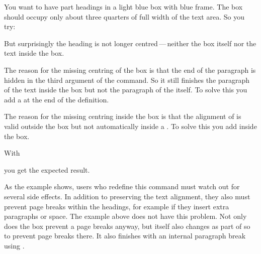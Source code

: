 \begin{Example}
  You want to have part headings in a light blue box with blue frame. The
  box should occupy only about three quarters of full width of the text
  area. So you try:
  But surprisingly the heading is not longer centred\,---\,neither the box
  itself nor the text inside the box.

  The reason for the missing centring of the box is that the end of the
  paragraph is hidden in the third argument of the command. So it still
  finishes the paragraph of the text inside the box but not the paragraph of
  the  itself. To solve this you add a  at the end of
  the definition.

  The reason for the missing centring inside the box is that the alignment of
   is valid outside the box but not
  automatically inside a . To solve this you add
   inside the box.

  With
  you get the expected result.
\end{Example}

As the example shows, users who redefine this command must watch out for
several side effects. In addition to preserving the text alignment, they also
must prevent page breaks within the headings, for example if they insert extra
paragraphs or space. The example above does not have this problem. Not only
does the box prevent a page breaks anyway, but \KOMAScript{} itself also
changes  as part of  so to prevent page
breaks there. It also finishes  with an internal paragraph break
using .


